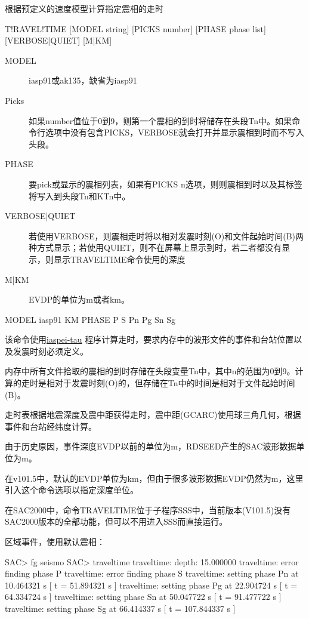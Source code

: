 \label{cmd:traveltime}

根据预定义的速度模型计算指定震相的走时

\begin{SACSTX}
T!RAVEL!TIME [MODEL string] [PICKS number] [PHASE phase list]
    [VERBOSE|QUIET] [M|KM]
\end{SACSTX}

\begin{description}
\item [MODEL] iasp91或ak135，缺省为iasp91
\item [Picks] 如果number值位于0到9，则第一个震相的到时将储存在头段Tn中。如果命令行选项中没有包含PICKS，VERBOSE就会打开并显示震相到时而不写入头段。
\item [PHASE] 要pick或显示的震相列表，如果有PICKS n选项，则则震相到时以及其标签将写入到头段Tn和KTn中。
\item [VERBOSE|QUIET] 若使用VERBOSE，则震相走时将以相对发震时刻(O)和文件起始时间(B)两种方式显示；若使用QUIET，则不在屏幕上显示到时，若二者都没有显示，则显示TRAVELTIME命令使用的深度
\item [M|KM] EVDP的单位为m或者km。
\end{description}

\begin{SACDFT}
MODEL iasp91 KM PHASE P S Pn Pg Sn Sg
\end{SACDFT}

该命令使用\href{http://www.iris.edu/software/downloads/processing/}{iaspei-tau}
程序计算走时，要求内存中的波形文件的事件和台站位置以及发震时刻必须定义。

内存中所有文件拾取的震相的到时存储在头段变量Tn中，其中n的范围为0到9。计算的走时是相对于发震时刻(O)的，但存储在Tn中的时间是相对于文件起始时间(B)。

走时表根据地震深度及震中距获得走时，震中距(GCARC)使用球三角几何，根据事件和台站经纬度计算。

由于历史原因，事件深度EVDP以前的单位为m，RDSEED产生的SAC波形数据单位为m。

在v101.5中，默认的EVDP单位为km，但由于很多波形数据EVDP仍然为m，这里引入这个命令选项以指定深度单位。

在SAC2000中，命令TRAVELTIME位于子程序SSS中，当前版本(V101.5)没有SAC2000版本的全部功能，但可以不用进入SSS而直接运行。

区域事件，使用默认震相：
\begin{SACCode}
SAC> fg seismo
SAC> traveltime
traveltime: depth: 15.000000
traveltime: error finding phase P
traveltime: error finding phase S
traveltime: setting phase Pn       at 10.464321 s [ t = 51.894321 s ]
traveltime: setting phase Pg       at 22.904724 s [ t = 64.334724 s ]
traveltime: setting phase Sn       at 50.047722 s [ t = 91.477722 s ]
traveltime: setting phase Sg      at 66.414337 s [ t = 107.844337 s ]
\end{SACCode}

